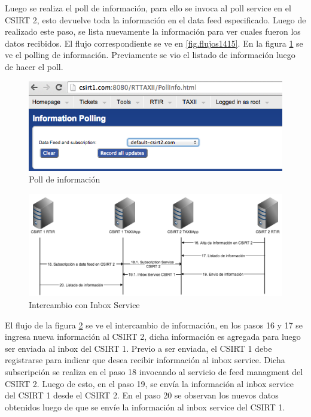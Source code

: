 Luego se realiza el poll de información, para ello se invoca al poll service en el CSIRT 2, esto devuelve toda la información en el data feed especificado. Luego de realizado este paso, se lista nuevamente la información para ver cuales fueron los datos recibidos. El flujo correspondiente se ve en \ref{fig.flujos1415}.
En la figura \ref{fig.pollinfo} se ve el polling de información. Previamente se vio el listado de información luego de hacer el poll.

\begin{figure}[H]
	\centering
	\includegraphics[scale=0.4]{caso-de-estudio/pollinformacion.png}
	\caption{Poll de información}
	\label{fig.pollinfo}
\end{figure}

\begin{figure}[H]
	\centering
	\includegraphics[scale=0.4]{flujos/flujo16-20.png}
	\caption{Intercambio con Inbox Service}
	\label{fig.flujos1620}
\end{figure}

El flujo de la figura \ref{fig.flujos1620} se ve el intercambio de información, en los pasos 16 y 17 se ingresa nueva información al CSIRT 2, dicha información es agregada para luego ser enviada al inbox del CSIRT 1. Previo a ser enviada, el CSIRT 1 debe registrarse para indicar que desea recibir información al inbox service. Dicha subscripción se realiza en el paso 18 invocando al servicio de feed managment del CSIRT 2. Luego de esto, en el paso 19, se envía la información al inbox service del CSIRT 1 desde el CSIRT 2.
En el paso 20 se observan los nuevos datos obtenidos luego de que se envíe la información al inbox service del CSIRT 1.

